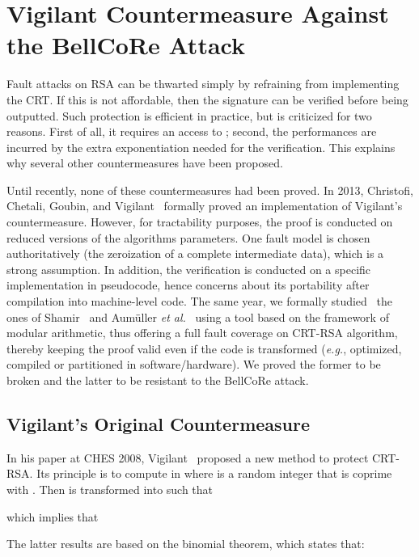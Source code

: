 \documentclass[10pt]{article}
\theoremstyle{definition}
\theoremstyle{theorem}
\newcommand{\eg}{\textit{e.g.}}
\newcommand{\etal}{\textit{et al.}\xspace}
\begin{document}
\section{Vigilant Countermeasure Against the BellCoRe Attack}
\label{sec-vigilant}

Fault attacks on RSA can be thwarted simply by refraining from implementing the CRT.
If this is not affordable, then the signature can be verified before being outputted.
Such protection is efficient in practice, but is criticized for two reasons.
First of all, it requires an access to ;
second, the performances are incurred by the extra exponentiation needed for the verification.
This explains why several other countermeasures have been proposed.

Until recently, none of these countermeasures had been proved.
In 2013, Christofi, Chetali, Goubin, and Vigilant~\cite{JCEN-Christofi13} formally proved an implementation of Vigilant's countermeasure.
However, for tractability purposes, the proof is conducted on reduced versions of the algorithms parameters.
One fault model is chosen authoritatively (the zeroization of a complete intermediate data), which is a strong assumption.
In addition, the verification is conducted on a specific implementation in pseudocode, hence concerns about its portability after compilation into machine-level code.
The same year, we formally studied~\cite{cryptoeprint:2013:506} the ones of Shamir~\cite{shamir-patent-rsa-crt} and Aumüller \etal~\cite{DBLP:conf/ches/AumullerBFHS02} using a tool based on the framework of modular arithmetic, thus offering a full fault coverage on CRT-RSA algorithm, thereby keeping the proof valid even if the code is transformed (\eg, optimized, compiled or partitioned in software/hardware).
We proved the former to be broken and the latter to be resistant to the BellCoRe attack.

\subsection{Vigilant's Original Countermeasure}
\label{sec-vigilant-orig}

In his paper at CHES 2008, Vigilant~\cite{DBLP:conf/ches/Vigilant08} proposed a new method to protect CRT-RSA.
Its principle is to compute  in  where  is a random integer that is coprime with .
Then  is transformed into  such that

which implies that

The latter results are based on the binomial theorem, which states that:
\end{document}
